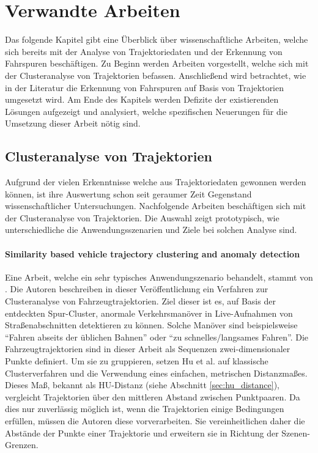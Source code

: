 ﻿%

\chapter{Verwandte Arbeiten}
\label{cha:related_work}

Das folgende Kapitel gibt eine Überblick über wissenschaftliche
Arbeiten, welche sich bereits mit der Analyse von Trajektoriedaten und der Erkennung von Fahrspuren beschäftigen.
Zu Beginn werden Arbeiten vorgestellt, welche sich mit der Clusteranalyse von Trajektorien befassen.
Anschließend wird betrachtet, wie in der Literatur die Erkennung von Fahrspuren auf Basis
von Trajektorien umgesetzt wird.
Am Ende des Kapitels werden Defizite der existierenden Lösungen aufgezeigt und analysiert, welche
spezifischen Neuerungen für die Umsetzung dieser Arbeit nötig sind.

\section{Clusteranalyse von Trajektorien}
\label{sec:rw_clustering}

Aufgrund der vielen Erkenntnisse welche aus Trajektoriedaten gewonnen werden können, ist ihre
Auswertung schon seit geraumer Zeit Gegenstand wissenschaftlicher Untersuchungen.
Nachfolgende Arbeiten beschäftigen sich mit der Clusteranalyse von Trajektorien.
Die Auswahl zeigt prototypisch, wie unterschiedliche die Anwendungsszenarien und Ziele bei solchen Analyse sind.

\subsubsection*{Similarity based vehicle trajectory clustering and anomaly detection}
Eine Arbeit, welche ein sehr typisches Anwendungszenario behandelt, stammt von \cite[]{Hu2005}. Die Autoren
beschreiben in dieser Veröffentlichung ein Verfahren zur Clusteranalyse von Fahrzeugtrajektorien. Ziel dieser
ist es, auf Basis der entdeckten Spur-Cluster, anormale Verkehrsmanöver in Live-Aufnahmen von Straßenabschnitten
detektieren zu können. Solche Manöver sind beispielsweise ``Fahren abseits der üblichen Bahnen'' oder
``zu schnelles/langsames Fahren''.
Die Fahrzeugtrajektorien sind in dieser Arbeit als Sequenzen zwei-dimensionaler Punkte definiert.
Um sie zu gruppieren, setzen Hu et al. auf klassische Clusterverfahren und die Verwendung eines
einfachen, metrischen Distanzmaßes. Dieses Maß, bekannt als HU-Distanz (siehe Abschnitt \ref{sec:hu_distance}),
vergleicht Trajektorien über den mittleren Abstand zwischen Punktpaaren.
Da dies nur zuverlässig möglich ist, wenn die Trajektorien einige Bedingungen erfüllen, müssen die
Autoren diese vorverarbeiten. Sie vereinheitlichen daher die Abstände der Punkte einer Trajektorie und erweitern
sie in Richtung der Szenen-Grenzen.

